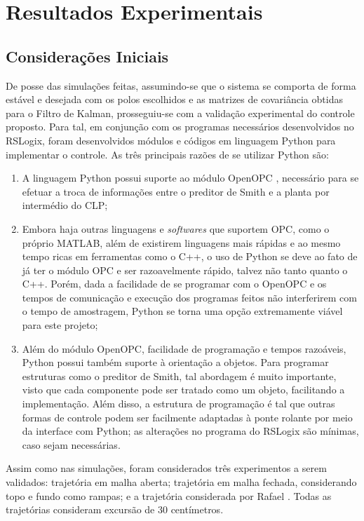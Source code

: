 \section{Resultados Experimentais}
\subsection{Considerações Iniciais}
De posse das simulações feitas, assumindo-se que o sistema se comporta de forma estável e desejada com os polos escolhidos e as matrizes de covariância obtidas para o Filtro de Kalman, prosseguiu-se com a validação experimental do controle proposto. Para tal, em conjunção com os programas necessários desenvolvidos no RSLogix, foram desenvolvidos módulos e códigos em linguagem Python para implementar o controle. As três principais razões de se utilizar Python são:
\begin{enumerate}
\item A linguagem Python possui suporte ao módulo OpenOPC \cite{OpenOPC}, necessário para se efetuar a troca de informações entre o preditor de Smith e a planta por intermédio do CLP;
\item Embora haja outras linguagens e \textit{softwares} que suportem OPC, como o próprio MATLAB, além de existirem linguagens mais rápidas e ao mesmo tempo ricas em ferramentas como o C++, o uso de Python se deve ao fato de já ter o módulo OPC e ser razoavelmente rápido, talvez não tanto quanto o C++. Porém, dada a facilidade de se programar com o OpenOPC e os tempos de comunicação e execução dos programas feitos não interferirem com o tempo de amostragem, Python se torna uma opção extremamente viável para este projeto;
\item Além do módulo OpenOPC, facilidade de programação e tempos razoáveis, Python possui também suporte à orientação a objetos. Para programar estruturas como o preditor de Smith, tal abordagem é muito importante, visto que cada componente pode ser tratado como um objeto, facilitando a implementação. Além disso, a estrutura de programação é tal que outras formas de controle podem ser facilmente adaptadas à ponte rolante por meio da interface com Python; as alterações no programa do RSLogix são mínimas, caso sejam necessárias.
\end{enumerate}

Assim como nas simulações, foram considerados três experimentos a serem validados: trajetória em malha aberta; trajetória em malha fechada, considerando topo e fundo como rampas; e a trajetória considerada por Rafael \cite{rafaelMestrado}. Todas as trajetórias consideram excursão de 30 centímetros.

